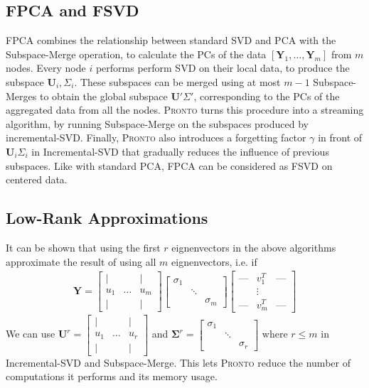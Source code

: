 \subsection{FPCA and FSVD}
FPCA combines the relationship between standard SVD and PCA with the
Subspace-Merge operation, to calculate the PCs of the data $[\mathbf{Y}_1,
\ldots,\mathbf{Y}_m]$ from $m$ nodes. Every node $i$ performs perform SVD  on
their local data, to produce the subspace $\mathbf{U}_i, \Sigma_i$. These
subspaces can be merged using at most $m-1$ Subspace-Merges to obtain the global
subspace $\mathbf{U}'\Sigma'$, corresponding to the PCs of the aggregated data
from all the nodes. \textsc{Pronto} turns this procedure into a streaming algorithm, by
running Subspace-Merge on the subspaces produced by incremental-SVD. Finally,
\textsc{Pronto} also introduces a forgetting factor $\gamma$ in front of
$\mathbf{U}_i\Sigma_i$ in Incremental-SVD that gradually reduces the influence
of previous subspaces. Like with standard PCA, FPCA can be considered as FSVD on
centered data.

\subsection{Low-Rank Approximations}
It can be shown that using the first $r$ eignenvectors in the above algorithms
approximate the result of using all $m$ eignenvectors, i.e. if
\begin{align}
\mathbf{Y} = \begin{bmatrix} \mid & & \mid \\ u_1 & \ldots & u_m
    \\ \mid & & \mid  \end{bmatrix} \begin{bmatrix} \sigma_1 &
        & \\ & \ddots & \\ & & \sigma_m \end{bmatrix} \begin{bmatrix} \text{---}
& v_1^T & \text{---} \\ & \vdots & \\ \text{---} & v_m^T & \text{---}
\end{bmatrix}
\end{align}
We can use $\mathbf{U}^r = \begin{bmatrix} \mid & & \mid \\ u_1 & \ldots & u_r
    \\ \mid & & \mid  \end{bmatrix}$ and $\mathbf{\Sigma}^r = \begin{bmatrix}
\sigma_1 & & \\ & \ddots & \\ & & \sigma_r \end{bmatrix}$ where $r \leq m$ in
Incremental-SVD and Subspace-Merge. This lets \textsc{Pronto} reduce the number of
computations it performs and its memory usage.

